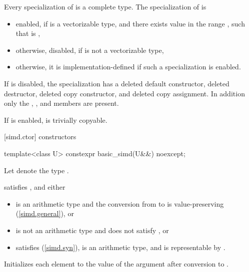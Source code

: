 \pnum
Every specialization of  is a complete type.
The specialization of  is
\begin{itemize}
  \item enabled, if  is a vectorizable type, and there exists value  in the range
    , such that  is ,
  \item otherwise, disabled, if  is not a vectorizable type,
  \item otherwise, it is implementation-defined if such a specialization is enabled.
\end{itemize}

If  is disabled, the specialization has a
deleted default constructor, deleted destructor, deleted copy constructor, and
deleted copy assignment.
In addition only the , , and
 members are present.

If  is enabled,  is
trivially copyable.

\pnum\ConversionsToIntrinsics

[simd.ctor]{ constructors}

\begin{itemdecl}
template<class U> constexpr basic_simd(U&&) noexcept;
\end{itemdecl}

\begin{itemdescr}
  \pnum Let  denote the type .

  \pnum\constraints
   satisfies , and either
  \begin{itemize}
    \item {} is an arithmetic type and the conversion from
       to  is value-preserving
      (\ref{simd.general}), or

    \item {} is not an arithmetic type and does not satisfy
      \tcode{\constexprwrapperlike}, or

    \item {} satisfies \tcode{\constexprwrapperlike} (\ref{simd.syn}),
       is an arithmetic type, and 
      is representable by .
  \end{itemize}

  \pnum\effects
  Initializes each element to the value of the argument after conversion to .
\end{itemdescr}

